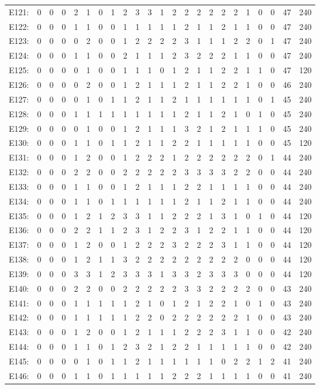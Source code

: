 \documentclass[12pt]{article}
\begin{document}
\begin{center}
\scriptsize
\begin{tabular}{ccccccccccccccccccccc|c|c}
E121:&0&0&0&2&1&0&1&2&3&3&1&2&2&2&2&2&2&1&0&0&47&240\\
E122:&0&0&0&1&1&0&0&1&1&1&1&1&2&1&1&2&1&1&0&0&47&240\\
E123:&0&0&0&0&2&0&0&1&2&2&2&2&3&1&1&1&2&2&0&1&47&240\\
E124:&0&0&0&1&1&0&0&2&1&1&1&2&3&2&2&2&1&1&0&0&47&240\\
E125:&0&0&0&0&1&0&0&1&1&1&0&1&2&1&1&2&2&1&1&0&47&120\\
E126:&0&0&0&0&2&0&0&1&2&1&1&1&2&1&1&2&2&1&0&0&46&240\\
E127:&0&0&0&0&1&0&1&1&2&1&1&2&1&1&1&1&1&1&0&1&45&240\\
E128:&0&0&0&1&1&1&1&1&1&1&1&1&2&1&1&2&1&0&1&0&45&240\\
E129:&0&0&0&0&1&0&0&1&2&1&1&1&3&2&1&2&1&1&1&0&45&240\\
E130:&0&0&0&1&1&0&1&1&2&1&1&2&2&1&1&1&1&1&0&0&45&120\\
E131:&0&0&0&1&2&0&0&1&2&2&2&1&2&2&2&2&2&2&0&1&44&240\\
E132:&0&0&0&2&2&0&0&2&2&2&2&2&3&3&3&3&2&2&0&0&44&240\\
E133:&0&0&0&1&1&0&0&1&2&1&1&1&2&2&1&1&1&1&0&0&44&240\\
E134:&0&0&0&1&1&0&1&1&1&1&1&1&2&1&1&2&1&1&0&0&44&240\\
E135:&0&0&0&1&2&1&2&3&3&1&1&2&2&2&1&3&1&0&1&0&44&120\\
E136:&0&0&0&2&2&1&1&2&3&1&2&2&3&1&2&2&1&1&0&0&44&120\\
E137:&0&0&0&1&2&0&0&1&2&2&2&3&2&2&2&3&1&1&0&0&44&120\\
E138:&0&0&0&1&2&1&1&3&2&2&2&2&2&2&2&2&2&0&0&0&44&120\\
E139:&0&0&0&3&3&1&2&3&3&3&1&3&3&2&3&3&3&0&0&0&44&120\\
E140:&0&0&0&2&2&0&0&2&2&2&2&2&3&3&2&2&2&2&0&0&43&240\\
E141:&0&0&0&1&1&1&1&1&2&1&0&1&2&1&2&2&1&0&1&0&43&240\\
E142:&0&0&0&1&1&1&1&1&2&2&0&2&2&2&2&2&2&1&0&0&43&240\\
E143:&0&0&0&1&2&0&0&1&2&1&1&1&2&2&2&3&1&1&0&0&42&240\\
E144:&0&0&0&1&1&0&1&2&3&2&1&2&2&1&1&1&1&1&0&0&42&240\\
E145:&0&0&0&0&1&0&1&1&2&1&1&1&1&1&1&0&2&2&1&2&41&240\\
E146:&0&0&0&1&1&0&1&1&1&1&1&2&2&2&1&1&1&1&0&0&41&240\\

\end{tabular}
\end{center}
\end{document}
